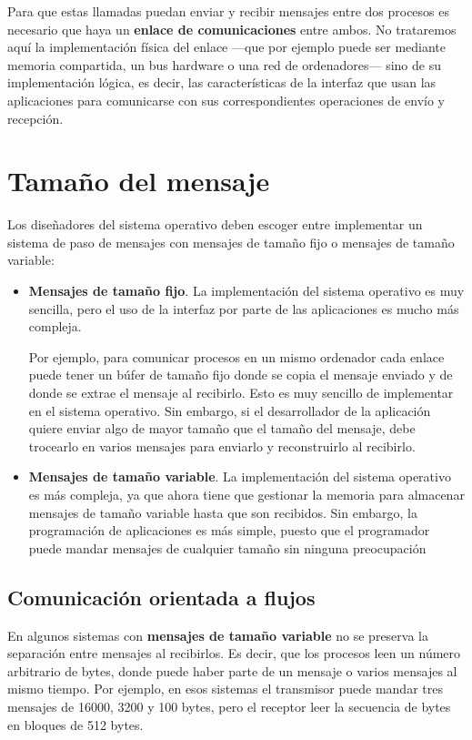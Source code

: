 Para que estas llamadas puedan enviar y recibir mensajes entre dos
procesos es necesario que haya un \textbf{enlace de comunicaciones}
entre ambos. No trataremos aquí la implementación física del enlace
---que por ejemplo puede ser mediante memoria compartida, un bus
hardware o una red de ordenadores--- sino de su implementación lógica,
es decir, las características de la interfaz que usan las aplicaciones
para comunicarse con sus correspondientes operaciones de envío y
recepción.

\section{Tamaño del mensaje}\label{_tamauxf1o_del_mensaje}

Los diseñadores del sistema operativo deben escoger entre implementar un
sistema de paso de mensajes con mensajes de tamaño fijo o mensajes de
tamaño variable:

\begin{itemize}
\item
  \textbf{Mensajes de tamaño fijo}. La implementación del sistema
  operativo es muy sencilla, pero el uso de la interfaz por parte de las
  aplicaciones es mucho más compleja.

  Por ejemplo, para comunicar procesos en un mismo ordenador cada enlace
  puede tener un búfer de tamaño fijo donde se copia el mensaje enviado
  y de donde se extrae el mensaje al recibirlo. Esto es muy sencillo de
  implementar en el sistema operativo. Sin embargo, si el desarrollador
  de la aplicación quiere enviar algo de mayor tamaño que el tamaño del
  mensaje, debe trocearlo en varios mensajes para enviarlo y
  reconstruirlo al recibirlo.
\item
  \textbf{Mensajes de tamaño variable}. La implementación del sistema
  operativo es más compleja, ya que ahora tiene que gestionar la memoria
  para almacenar mensajes de tamaño variable hasta que son recibidos.
  Sin embargo, la programación de aplicaciones es más simple, puesto que
  el programador puede mandar mensajes de cualquier tamaño sin ninguna
  preocupación
\end{itemize}

\subsection{Comunicación orientada a
flujos}\label{_comunicaciuxf3n_orientada_a_flujos}

En algunos sistemas con \textbf{mensajes de tamaño variable} no se
preserva la separación entre mensajes al recibirlos. Es decir, que los
procesos leen un número arbitrario de bytes, donde puede haber parte de
un mensaje o varios mensajes al mismo tiempo. Por ejemplo, en esos
sistemas el transmisor puede mandar tres mensajes de 16000, 3200 y 100
bytes, pero el receptor leer la secuencia de bytes en bloques de 512
bytes.

